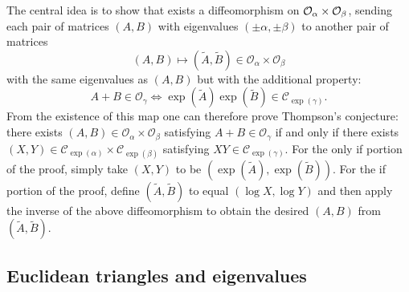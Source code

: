 \documentclass[notitlepage, 10pt]{article}
\begin{document}
The central idea is to show that exists a diffeomorphism on $\mathcal O_{\alpha} \times \mathcal O_{\beta}$, sending each pair of matrices $(A,B)$ with eigenvalues $(\pm \alpha, \pm \beta)$ to another pair of matrices
\begin{equation}
    (A,B) \mapsto (\tilde A, \tilde B) \in \mathcal O_{\alpha} \times \mathcal O_{\beta}
\end{equation}
with the same eigenvalues as $(A, B)$ but with the additional property:
\begin{equation}
    A + B \in \mathcal O_{\gamma} \iff \exp(\tilde A)\exp(\tilde B) \in \mathcal C_{\exp(\gamma)}.
\end{equation}
From the existence of this map one can therefore prove Thompson's conjecture: there exists $(A,B) \in \mathcal O_{\alpha} \times \mathcal O_{\beta}$ satisfying $A+B\in\mathcal O_{\gamma}$ if and only if there exists $(X,Y) \in \mathcal C_{\exp(\alpha)} \times \mathcal C_{\exp(\beta)}$ satisfying $XY \in \mathcal C_{\exp(\gamma)}$.
For the only if portion of the proof, simply take $(X,Y)$ to be $(\exp(\tilde A), \exp(\tilde B))$.
For the if portion of the proof, define $(\tilde A, \tilde B)$ to equal $(\log X, \log Y)$ and then apply the inverse of the above diffeomorphism to obtain the desired $(A, B)$ from $(\tilde A, \tilde B)$.

\subsection{Euclidean triangles and eigenvalues}
\end{document}
